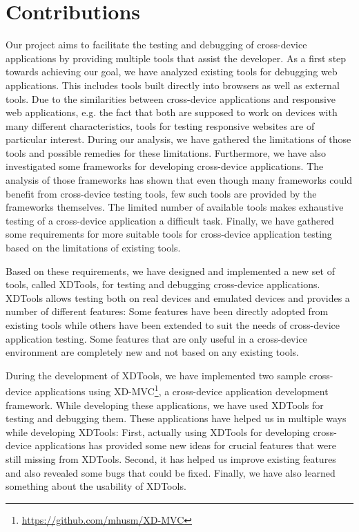 \section{Contributions}

Our project aims to facilitate the testing and debugging of cross-device applications by providing multiple tools that assist the developer. As a first step towards achieving our goal, we have analyzed existing tools for debugging web applications. This includes tools built directly into browsers as well as external tools. Due to the similarities between cross-device applications and responsive web applications, e.g. the fact that both are supposed to work on devices with many different characteristics, tools for testing responsive websites are of particular interest. During our analysis, we have gathered the limitations of those tools and possible remedies for these limitations. Furthermore, we have also investigated some frameworks for developing cross-device applications. The analysis of those frameworks has shown that even though many frameworks could benefit from cross-device testing tools, few such tools are provided by the frameworks themselves. The limited number of available tools makes exhaustive testing of a cross-device application a difficult task. Finally, we have gathered some requirements for more suitable tools for cross-device application testing based on the limitations of existing tools.

Based on these requirements, we have designed and implemented a new set of tools, called XDTools, for testing and debugging cross-device applications. XDTools allows testing both on real devices and emulated devices and provides a number of different features: Some features have been directly adopted from existing tools while others have been extended to suit the needs of cross-device application testing. Some features that are only useful in a cross-device environment are completely new and not based on any existing tools.

During the development of XDTools, we have implemented two sample cross-device applications using XD-MVC\footnote{\url{https://github.com/mhusm/XD-MVC}}, a cross-device application development framework. While developing these applications, we have used XDTools for testing and debugging them. These applications have helped us in multiple ways while developing XDTools: First, actually using XDTools for developing cross-device applications has provided some new ideas for crucial features that were still missing from XDTools. Second, it has helped us improve existing features and also revealed some bugs that could be fixed. Finally, we have also learned something about the usability of XDTools.


